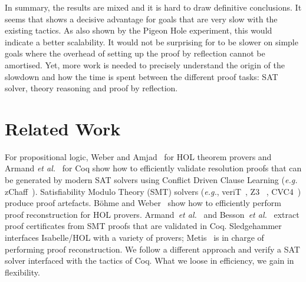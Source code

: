 \documentclass[utf8,a4paper,UKenglish,cleveref, autoref, thm-restate]{lipics-v2019}
\begin{document}
In summary, the results are mixed and it is hard to draw definitive conclusions.
%
It seems that  shows a decisive advantage for goals that
are very slow with the existing tactics.
As also shown by the Pigeon Hole experiment, this would indicate a better scalability.
%
It would not be surprising for  to be slower on simple goals where
the overhead of setting up the proof by reflection cannot be amortised.
%
Yet, more work is needed to precisely understand the origin of the
slowdown and how the time is spent between the different proof tasks:
SAT solver, theory reasoning and proof by reflection.

\section{Related Work}
\label{sec:related-work}


For propositional logic, Weber and Amjad~\cite{WeberA09} for HOL
theorem provers and Armand \emph{et al.}~\cite{ArmandGST10} for Coq
show how to efficiently validate resolution proofs that can be
generated by modern SAT solvers using Conflict Driven Clause Learning
(\emph{e.g.} zChaff~\cite{MoskewiczMZZM01}).
%
Satisfiability Modulo Theory (SMT) solvers (\emph{e.g.},
veriT~\cite{BoutonODF09}, Z3~\cite{MouraB08} ,
CVC4~\cite{DetersR0BT14}) produce proof artefacts. Böhme and
Weber~\cite{BohmeW10} show how to efficiently perform proof
reconstruction for HOL provers. Armand~\emph{et
  al.}~\cite{ArmandFGKTW11} and Besson~\emph{et al.}~\cite{BessonCP11}
extract proof certificates from SMT proofs that are validated in Coq.
%
Sledgehammer~\cite{BlanchetteBP13} interfaces Isabelle/HOL with a
variety of provers; Metis~\cite{Hurd03first-orderproof,PaulsonS07} is
in charge of performing proof reconstruction.
%
We follow a different approach and verify a SAT solver interfaced with
the tactics of Coq. What we loose in efficiency, we gain in flexibility.
\end{document}

